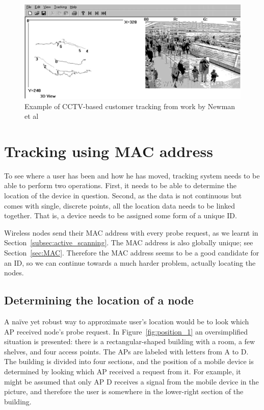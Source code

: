 \documentclass[12pt,a4paper,oneside,pdftex]{report}
\begin{document}
\begin{figure}
    \includegraphics[width=\textwidth]{images/cctv_tracking_newman_pic1}
    \caption{Example of CCTV-based customer tracking from work by Newman et al~\cite{Newman2002253}}
    \label{fig:cctv_tracking}
\end{figure}


\section{Tracking using MAC address}
\label{sec:mac_tracking}

To see where a user has been and how he has moved, tracking system needs to be able to perform two operations. First, it needs to be able to determine the location of the device in question. Second, as the data is not continuous but comes with single, discrete points, all the location data needs to be linked together. That is, a device needs to be assigned some form of a unique ID.

Wireless nodes send their MAC address with every probe request, as we learnt in Section~\ref{subsec:active_scanning}. The MAC address is also globally unique; see Section~\ref{sec:MAC}. Therefore the MAC address seems to be a good candidate for an ID, so we can continue towards a much harder problem, actually locating the nodes.

\subsection{Determining the location of a node}
\label{sec:location}

A na{\"i}ve yet robust way to approximate user's location would be to look which AP received node's probe request. In Figure~\ref{fig:position_1} an oversimplified situation is presented: there is a rectangular-shaped building with a room, a few shelves, and four access points. The APs are labeled with letters from A to D. The building is divided into four sections, and the position of a mobile device is determined by looking which AP received a request from it. For example, it might be assumed that only AP D receives a signal from the mobile device in the picture, and therefore the user is somewhere in the lower-right section of the building.
\end{document}
